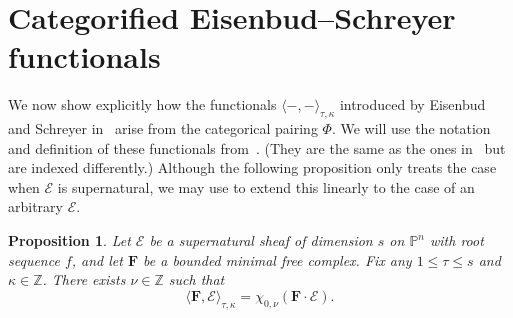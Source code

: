 \documentclass[12pt]{amsart}
\newtheorem{prop}[lemma]{Proposition}
\theoremstyle{definition}
\theoremstyle{remark}
\newcommand{\PP}{\mathbb{P}}
\newcommand{\ZZ}{\mathbb{Z}}
\newcommand{\cE}{\mathcal{E}}
\newcommand{\FF}{\mathbf{F}}
\begin{document}
\section{Categorified Eisenbud--Schreyer functionals}\label{sec:functionals}

We now show explicitly how the functionals $\langle -, -\rangle_{\tau,\kappa}$
introduced by Eisenbud and Schreyer in~\cite{eis-schrey1}
arise from the
categorical pairing $\Phi$. We will use the notation and definition of these
functionals from~\cite{eis-schrey-icm}. (They are the same as the ones in~\cite{eis-schrey1} but are indexed differently.)
Although the following proposition only treats
the case when $\cE$ is supernatural, we may use \cite[Theorem~0.1]{eis-schrey2} to extend this linearly to the case of an arbitrary $\cE$.

\begin{prop}\label{thm:categorified:2}
Let $\cE$ be a supernatural sheaf of dimension $s$ on $\PP^n$ with root sequence $f$, and let $\FF$ be a bounded minimal free complex. Fix any $1\leq \tau\leq s$ and $\kappa\in \ZZ$.  There exists $\nu\in \ZZ$ such that
\[
\langle \FF, \cE\rangle_{\tau,\kappa}= 
 \chi_{0, \nu}(\FF\cdot \cE).
\]
\end{prop}
\end{document}

